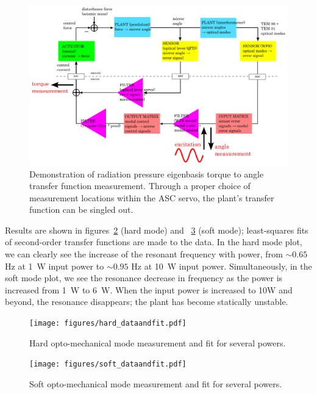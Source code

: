 \begin{figure}
\begin{centering}
\includegraphics[width=1.0\textwidth]{figures/ascservo_measurement.pdf}
\caption[Demonstration of radiation pressure eigenbasis torque to
  angle transfer function measurement]{Demonstration of radiation pressure eigenbasis torque to
  angle transfer function measurement. Through a proper choice of measurement
  locations within the ASC servo, the plant's transfer function can be
  singled out.}
\label{fig:RPTFmeasurement}
\end{centering}
\end{figure}

Results are shown in figures~\ref{fig:hardTF} (hard mode) and
~\ref{fig:softTF} (soft mode); least-squares fits of second-order
transfer functions are made to the data.  In the hard mode plot, we
can clearly see the increase of the resonant frequency with power,
from $\sim0.65$ Hz at 1~W input power to $\sim0.95$ Hz at 10~W input
power.  Simultaneously, in the soft mode plot, we see the resonance
decrease in frequency as the power is increased from 1~W to 6~W.  When
the input power is increased to 10W and beyond, the resonance
disappears; the plant has become statically unstable.

\begin{figure}
\begin{centering}
\texttt{[image: figures/hard\_dataandfit.pdf]}
\caption{Hard opto-mechanical mode measurement and fit for several
 powers.}
\label{fig:hardTF}
\end{centering}
\end{figure}

\begin{figure}
\begin{centering}
\texttt{[image: figures/soft\_dataandfit.pdf]}
\caption{Soft opto-mechanical mode measurement and fit for several
 powers.}
\label{fig:softTF}
\end{centering}
\end{figure}

